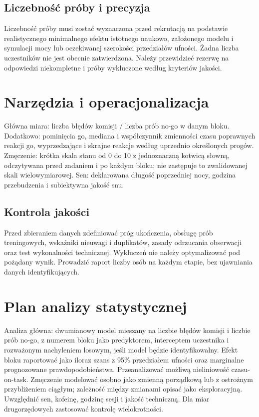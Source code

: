 \documentclass[11pt,a4paper]{article}
\begin{document}
\subsection{Liczebność próby i precyzja}
Liczebność próby musi zostać wyznaczona przed rekrutacją na podstawie realistycznego minimalnego efektu istotnego naukowo, założonego modelu i symulacji mocy lub oczekiwanej szerokości przedziałów ufności. Żadna liczba uczestników nie jest obecnie zatwierdzona. Należy przewidzieć rezerwę na odpowiedzi niekompletne i próby wykluczone według kryteriów jakości.
\section{Narzędzia i operacjonalizacja}
Główna miara: liczba błędów komisji / liczba prób no-go w danym bloku. Dodatkowo: pominięcia go, mediana i współczynnik zmienności czasu poprawnych reakcji go, wyprzedzające i skrajne reakcje według uprzednio określonych progów. Zmęczenie: krótka skala stanu od 0 do 10 z jednoznaczną kotwicą słowną, odczytywana przed zadaniem i po każdym bloku; nie zastępuje to zwalidowanej skali wielowymiarowej. Sen: deklarowana długość poprzedniej nocy, godzina przebudzenia i subiektywna jakość snu.
\subsection{Kontrola jakości}
Przed zbieraniem danych zdefiniować próg ukończenia, obsługę prób treningowych, wskaźniki nieuwagi i duplikatów, zasady odrzucania obserwacji oraz test wykonalności technicznej. Wykluczeń nie należy optymalizować pod pożądany wynik. Prowadzić raport liczby osób na każdym etapie, bez ujawniania danych identyfikujących.
\section{Plan analizy statystycznej}
Analiza główna: dwumianowy model mieszany na liczbie błędów komisji i liczbie prób no-go, z numerem bloku jako predyktorem, interceptem uczestnika i rozważonym nachyleniem losowym, jeśli model będzie identyfikowalny. Efekt bloku raportować jako iloraz szans z 95\% przedziałem ufności oraz marginalne prognozowane prawdopodobieństwa. Przeanalizować możliwą nieliniowość czasu-on-task. Zmęczenie modelować osobno jako zmienną porządkową lub z ostrożnym przybliżeniem ciągłym; zależność między zmianami opisać jako eksploracyjną. Uwzględnić sen, kofeinę, godzinę sesji i jakość techniczną. Dla miar drugorzędowych zastosować kontrolę wielokrotności.
\end{document}
